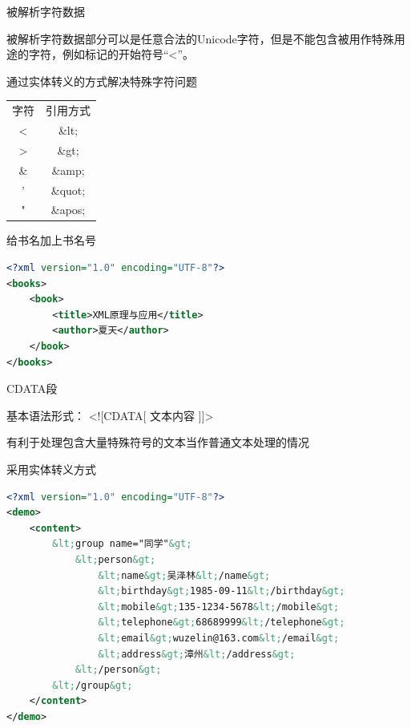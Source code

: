 \begin{frame}{被解析字符数据}
\par 被解析字符数据部分可以是任意合法的Unicode字符，但是不能包含被用作特殊用途的字符，例如标记的开始符号“<”。
\par 通过实体转义的方式解决特殊字符问题
\begin{center}
    \begin{tabular}{|c|c|}
    \Xhline{1.3pt}
    字符 &    引用方式 \\
    \Xhline{1.3pt}
     < & \&lt;  \\
     \hline
     > & \&gt;  \\
    \hline
    \& & \&amp;  \\
    \hline
    ' & \&quot;  \\
    \hline
    " & \&apos;  \\
    \hline
    \end{tabular}
\end{center}
\end{frame}


\begin{frame}[fragile]{给书名加上书名号}
\begin{lstlisting}[tabsize=8, basicstyle=\small\tt, language=XML]
<?xml version="1.0" encoding="UTF-8"?>
<books>
    <book>
        <title>XML原理与应用</title>
        <author>夏天</author>    
    </book>
</books>
\end{lstlisting}
\end{frame}


\begin{frame}{CDATA段}
\begin{shaded} 
\par 基本语法形式： <![CDATA[ 文本内容 ]]>
\par 有利于处理包含大量特殊符号的文本当作普通文本处理的情况
\end{shaded}
\end{frame}

\begin{frame}[fragile]{采用实体转义方式}
\begin{lstlisting}[tabsize=8, basicstyle=\small\tt, language=XML]
<?xml version="1.0" encoding="UTF-8"?>
<demo>
    <content>
        &lt;group name="同学"&gt;
            &lt;person&gt;
                &lt;name&gt;吴泽林&lt;/name&gt;
                &lt;birthday&gt;1985-09-11&lt;/birthday&gt;
                &lt;mobile&gt;135-1234-5678&lt;/mobile&gt;
                &lt;telephone&gt;68689999&lt;/telephone&gt;
                &lt;email&gt;wuzelin@163.com&lt;/email&gt;
                &lt;address&gt;漳州&lt;/address&gt;
            &lt;/person&gt;
        &lt;/group&gt;
    </content>
</demo>
\end{lstlisting}
\end{frame}


